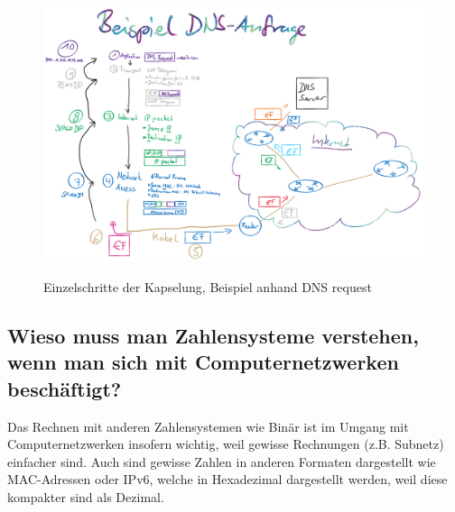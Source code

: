 \begin{figure}[H]
    \begin{center}
    \label{pic:tcp2}
    \includegraphics[width=\textwidth]{images/Nachrichtenaustausch02.png}
    \caption{Einzelschritte der Kapselung, Beispiel anhand DNS request}
    \end{center}
\end{figure}

\subsection*{Wieso muss man Zahlensysteme verstehen, wenn man sich mit Computernetzwerken beschäftigt?}\label{sub:ZahlensystemeVerstehen}
Das Rechnen mit anderen Zahlensystemen wie Binär ist im Umgang mit Computernetzwerken insofern wichtig, weil gewisse Rechnungen (z.B. Subnetz) einfacher sind. Auch sind gewisse Zahlen in anderen Formaten dargestellt wie MAC-Adressen oder IPv6, welche in Hexadezimal dargestellt werden, weil diese kompakter sind als Dezimal.

\pagebreak
